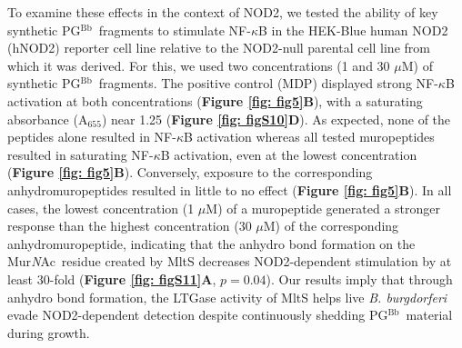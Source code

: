 \documentclass[twoside, watermark]{zHenriquesLab-StyleBioRxiv}
\newcommand{\tmu}{$\mu$} %
\newcommand{\pgbb}{PG$^\text{Bb}$}
\newcommand{\NAM}{Mur\textit{N}Ac}
\begin{document}
\vspace{1mm}
To examine these effects in the context of NOD2, we tested the ability of key synthetic \pgbb~fragments to stimulate NF-$\kappa$B in the HEK-Blue human NOD2 (hNOD2) reporter cell line relative to the NOD2-null parental cell line from which it was derived. For this, we used two concentrations (1 and 30 \tmu M) of synthetic \pgbb~fragments. The positive control (MDP) displayed strong NF-$\kappa$B activation at both concentrations (\textbf{Figure \ref{fig: fig5}B}), with a saturating absorbance (A$_\text{655}$) near 1.25 (\textbf{Figure \ref{fig: figS10}D}). As expected, none of the peptides alone resulted in NF-$\kappa$B activation whereas all tested muropeptides resulted in saturating NF-$\kappa$B activation, even at the lowest concentration (\textbf{Figure \ref{fig: fig5}B}). Conversely, exposure to the corresponding anhydromuropeptides resulted in little to no effect (\textbf{Figure \ref{fig: fig5}B}). In all cases, the lowest concentration (1 \tmu M) of a muropeptide generated a stronger response than the highest concentration (30 \tmu M) of the corresponding anhydromuropeptide, indicating that the anhydro bond formation on the \NAM~residue created by MltS decreases NOD2-dependent stimulation by at least 30-fold (\textbf{Figure \ref{fig: figS11}A}, $p = 0.04$). Our results imply that through anhydro bond formation, the LTGase activity of MltS helps live \textit{B. burgdorferi} evade NOD2-dependent detection despite continuously shedding \pgbb~material during growth.
\end{document}
